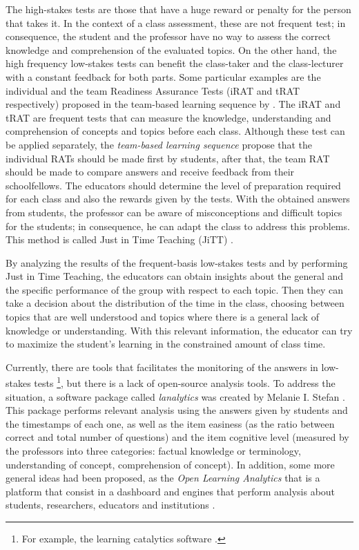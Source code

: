\documentclass{article}
\begin{document}
The high-stakes tests are those that have a huge reward or penalty for the person that takes it. In the context of a class assessment, these are not frequent test; in consequence, the student and the professor have no way to assess the correct knowledge and comprehension of the evaluated topics. On the other hand, the high frequency low-stakes tests can benefit the class-taker and the class-lecturer with a constant feedback for both parts. Some particular examples are the individual and the team Readiness Assurance Tests (iRAT and tRAT respectively) proposed in the team-based learning sequence by \cite{michaelsen2002team}.
The iRAT and tRAT are frequent tests that can measure the knowledge, understanding and comprehension of concepts and topics before each class. Although these test can be applied separately, the \textit{team-based learning sequence} \cite{michaelsen2002team} propose that the individual RATs should be made first by students, after that, the team RAT should be made to compare answers and receive feedback from their schoolfellows. The educators should determine the level of preparation required for each class and also the rewards given by the tests. With the obtained answers from students, the professor can be aware of misconceptions and difficult topics for the students; in consequence, he can adapt the class to address this problems. This method is called Just in Time Teaching (JiTT) \cite{jitt}. 

By analyzing the results of the frequent-basis low-stakes tests and by performing Just in Time Teaching, the educators can obtain insights about the general and the specific performance of the group with respect to each topic. Then they can take a decision about the distribution of the time in the class, choosing between topics that are well understood and topics where there is a general lack of knowledge or understanding. With this relevant information, the educator can try to maximize the student's learning in the constrained amount of class time. 

Currently, there are tools that facilitates the monitoring of the answers in low-stakes tests \footnote{For example, the learning catalytics software \cite{Schell2013}.}, but there is a lack of open-source analysis tools. To address the situation, a software package called \textit{lanalytics} was created by Melanie I. Stefan \cite{Stefan2015b}. This package performs relevant analysis using the answers given by students and the timestamps of each one, as well as the item easiness (as the ratio between correct and total number of questions) and the item cognitive level (measured by the professors into three categories: factual knowledge or terminology, understanding of concept, comprehension of concept). In addition, some more general ideas had been proposed, as the \textit{Open Learning Analytics} that is a platform that consist in a dashboard and engines that perform analysis about students, researchers, educators and institutions \cite{siemens2011open}.
\end{document}
